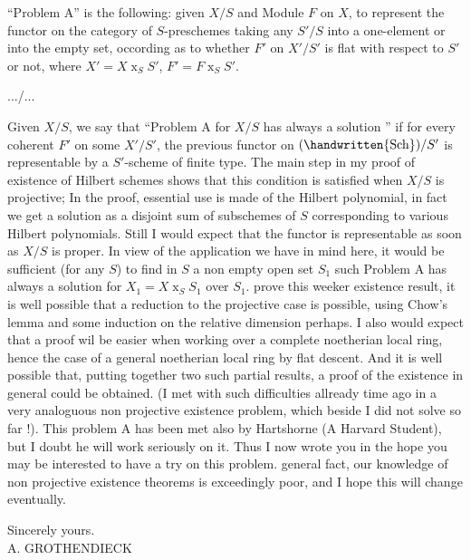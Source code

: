 ``Problem A'' is the following: given $X/S$ and Module $F$ on $X$, to represent the functor on the category of $S$-preschemes taking any $S'/S$ into a one-element or into the empty set, occording as to whether $F'$ on $X'/S'$ is flat with respect to $S'$ or not, where $X'=X\mathbin{x}_{S}S'$, $F'=F\mathbin{x}_{S}S'$.

\hfill .../...\par

Given $X/S$, we say that ``Problem A for $X/S$ has always a solution '' if for every coherent $F'$ on some $X'/S'$, the previous functor on $(\handwritten{\mathrm{Sch}})/S'$ is representable by a $S'$-scheme of finite type. The main step in my proof of existence of Hilbert schemes shows that this condition is satisfied when $X/S$ is projective; In the proof, essential use is made of the Hilbert polynomial, in fact we get a solution as a disjoint sum of subschemes of $S$ corresponding to various Hilbert polynomials. Still I would expect that the functor is representable as soon as $X/S$ is proper. In view of the application we have in mind here, it would be sufficient (for any  $S$) to find in $S$ a non empty open set $S_{1}$ such Problem A has always a solution for $X_{1}=X\mathbin{x}_{S}S_{1}$ over $S_{1}$.  prove this weeker existence result, it is well possible that a reduction to the projective case is possible, using Chow's lemma and some induction on the relative dimension perhaps. I also would expect that a proof wil be easier when working over a complete noetherian local ring, hence the case of a general noetherian local ring by flat descent. And it is well possible that, putting together two such partial results, a proof of the existence in general could be obtained. (I met with such difficulties allready time ago in a very analoguous non projective existence problem, which beside I did not solve so far !). This problem A has been met also by Hartshorne (A Harvard Student), but I doubt he will work seriously on it. Thus I now wrote you in the hope you may be interested to have a try on this problem.  general fact, our knowledge of non projective existence theorems is exceedingly poor, and I hope this will change eventually.

Sincerely yours.\\

A. GROTHENDIECK\\

\\

